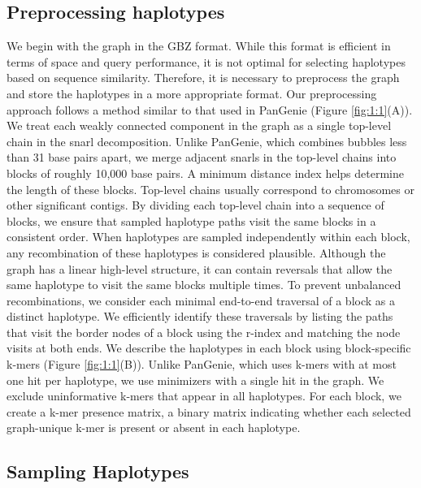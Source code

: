 \documentclass[11pt]{ucthesis}
\begin{document}
\subsection{Preprocessing haplotypes}
We begin with the graph in the GBZ format. While this format is efficient in terms of space and query performance, it is not optimal for selecting haplotypes based on sequence similarity. Therefore, it is necessary to preprocess the graph and store the haplotypes in a more appropriate format.
Our preprocessing approach follows a method similar to that used in PanGenie (Figure \ref{fig:1:1}(A)). We treat each weakly connected component in the graph as a single top-level chain in the snarl decomposition. Unlike PanGenie, which combines bubbles less than 31 base pairs apart, we merge adjacent snarls in the top-level chains into blocks of roughly 10,000 base pairs. A minimum distance index \cite{chang2020distance} helps determine the length of these blocks.
Top-level chains usually correspond to chromosomes or other significant contigs. By dividing each top-level chain into a sequence of blocks, we ensure that sampled haplotype paths visit the same blocks in a consistent order. When haplotypes are sampled independently within each block, any recombination of these haplotypes is considered plausible. Although the graph has a linear high-level structure, it can contain reversals that allow the same haplotype to visit the same blocks multiple times. To prevent unbalanced recombinations, we consider each minimal end-to-end traversal of a block as a distinct haplotype. We efficiently identify these traversals by listing the paths that visit the border nodes of a block using the r-index \cite{gagie2020fully} and matching the node visits at both ends.
We describe the haplotypes in each block using block-specific k-mers (Figure \ref{fig:1:1}(B)). Unlike PanGenie, which uses k-mers with at most one hit per haplotype, we use minimizers with a single hit in the graph. We exclude uninformative k-mers that appear in all haplotypes. For each block, we create a k-mer presence matrix, a binary matrix indicating whether each selected graph-unique k-mer is present or absent in each haplotype.

\subsection{Sampling Haplotypes}
\end{document}
